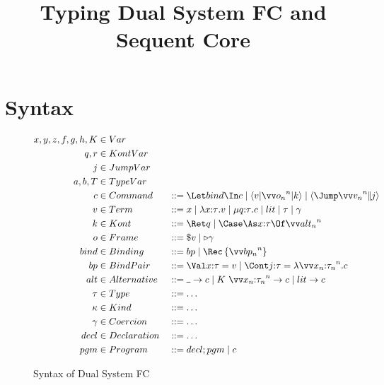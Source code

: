 \documentclass{article}
\begin{document}
\title{Typing Dual System FC and Sequent Core}

\maketitle

\section{Syntax}
\label{sec:syntax}

\begin{figure}[h]
\centering
\begin{gather*}
\begin{aligned}
  x, y, z, f, g, h, K &\in Var
  \\
  q, r &\in KontVar
  \\
  j &\in JumpVar
  \\
  a, b, T &\in TypeVar
  \\
  \cmd &\in Command
  &
  &::= \Let \abind \In c
  \Alt \braket{\tm | \vect[n]{\frm_n} | \ko}
  \Alt \jump{\vect[n]{\tm_n}}{j}
  \\
  \tm &\in Term
  &
  &::= x
  \Alt \fn{\ann x \ty} \tm
  \Alt \compute{\ann q \ty} \cmd
  \Alt \lit
  \Alt \ty
  \Alt \cn
  \\
  \ko &\in Kont
  &
  &::= \ret q
  \Alt \caseas{\ann x \ty}{\vect[n]{\analt_n}}
  \\
  \frm &\in Frame
  &
  &::= \appto{\tm} \Alt \castby{\cn}
  \\
  \abind &\in Binding
  &
  &::= \nonrec \bp
  \Alt \rec{\vect[n]{\bp_n}}
  \\
  \bp &\in BindPair
  &
  &::= \bindv{\ann x \ty}{\tm}
  \Alt \bindk{\ann j \ty}{\fnk{\vect[n]{\ann{x_n}{\ty_n}}}\cmd}
  \\
  \analt &\in Alternative
  &
  &::= \alt{\blank}{\cmd}
  \Alt \alt{K ~ \vect[n]{\ann{x_n}{\ty_n}}}{\cmd}
  \Alt \alt{\lit}{\cmd}
  \\
  \ty &\in Type
  &
  &::= \dots
  \\
  \ki &\in Kind
  &
  &::= \dots
  \\
  \cn &\in Coercion
  &
  &::= \dots
  \\
  \decl &\in Declaration
  &
  &::= \dots
  \\
  \pgm &\in Program
  &
  &::= \decl; \pgm
  \Alt \cmd
\end{aligned}
\end{gather*}
\caption{Syntax of Dual System FC}
\label{fig:dual-fc-syntax}
\end{figure}
\end{document}
